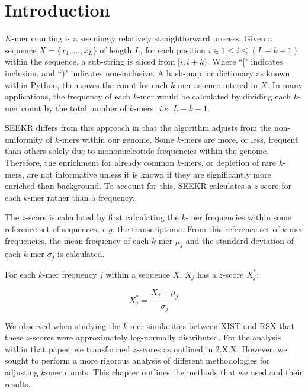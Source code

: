 \section{Introduction}
$K$-mer counting is a seemingly relatively straightforward process. Given a sequence $X = \{x_1,\dots,x_L\}$ of length $L$, for each position $i\in 1\leq i\leq \left(L-k+1\right)$ within the sequence, a sub-string is sliced from $[i,i+k)$. Where ``[" indicates inclusion, and ``)" indicates non-inclusive. A hash-map, or dictionary as known within Python, then saves the count for each $k$-mer as encountered in $X$. In many applications, the frequency of each $k$-mer would be calculated by dividing each $k$-mer count by the total number of $k$-mers, \emph{i.e.} $L-k+1$. 

SEEKR differs from this approach in that the algorithm adjusts from the non-uniformity of $k$-mers within our genome. Some $k$-mers are more, or less, frequent than others solely due to mononucleotide frequencies within the genome. Therefore, the enrichment for already common $k$-mers, or depletion of rare $k$-mers, are not informative unless it is known if they are significantly more enriched than background. To account for this, SEEKR calculates a $z$-score for each $k$-mer rather than a frequency.

The $z$-score is calculated by first calculating the $k$-mer frequencies within some reference set of sequences, \emph{e.g.} the transcriptome. From this reference set of $k$-mer frequencies, the mean frequency of each $k$-mer $\mu_j$ and the standard deviation of each $k$-mer $\sigma_j$ is calculated. 

For each $k$-mer frequency $j$ within a sequence $X$, $X_j$ has a $z$-score $X^*_j$: 

\begin{equation}
    X_j^* = \frac{X_j-\mu_j}{\sigma_j}
    \label{eq:zscore}
\end{equation}


We observed when studying the $k$-mer similarities between XIST and RSX that these $z$-scores were approximately log-normally distributed. For the analysis within that paper, we transformed $z$-scores as outlined in 2.X.X. However, we sought to perform a more rigorous analysis of different methodologies for adjusting $k$-mer counts. This chapter outlines the methods that we used and their results. 

